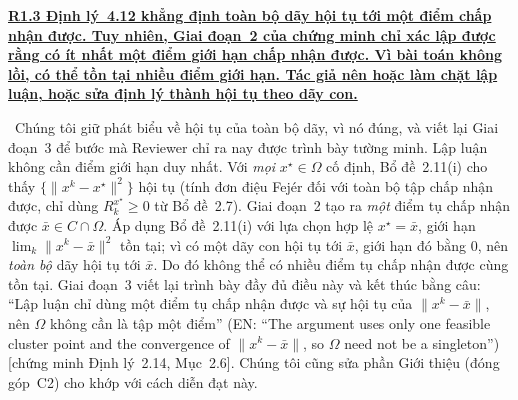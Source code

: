 \documentclass[11pt]{article}
\newcommand{\response}[1]{\smallskip\noindent{\color{blue!60!black}\textbf{Trả lời.}}\ #1\par\medskip}
\newcommand{\loc}[1]{\textcolor{blue!50!black}{[#1]}}
\newcommand{\en}[1]{{\color{gray}\small(EN: ``#1'')}}
\newenvironment{point}[1]{\medskip\noindent\textbf{\uline{#1}}\par}{\par}
\begin{document}
\begin{point}{R1.3 Định lý~4.12 khẳng định toàn bộ dãy hội tụ tới một điểm chấp nhận
được. Tuy nhiên, Giai đoạn~2 của chứng minh chỉ xác lập được rằng có ít nhất một điểm giới hạn
chấp nhận được. Vì bài toán không lồi, có thể tồn tại nhiều điểm giới hạn. Tác giả
nên hoặc làm chặt lập luận, hoặc sửa định lý thành hội tụ theo
dãy con.}
\response{Chúng tôi giữ phát biểu về hội tụ của toàn bộ dãy, vì nó đúng, và viết lại
Giai đoạn~3 để bước mà Reviewer chỉ ra nay được trình bày tường minh. Lập luận không
cần điểm giới hạn duy nhất. Với \emph{mọi} $x^\star\in\Omega$ cố định, Bổ đề~2.11(i)
cho thấy $\{\lVert x^k-x^\star\rVert^2\}$ hội tụ (tính đơn điệu Fej\'er đối với
toàn bộ tập chấp nhận được, chỉ dùng $R^{x^\star}_k\ge0$ từ Bổ đề~2.7). Giai đoạn~2
tạo ra \emph{một} điểm tụ chấp nhận được $\bar x\in C\cap\Omega$. Áp dụng Bổ đề~2.11(i)
với lựa chọn hợp lệ $x^\star=\bar x$, giới hạn $\lim_k\lVert x^k-\bar x\rVert^2$
tồn tại; vì có một dãy con hội tụ tới $\bar x$, giới hạn đó bằng $0$, nên \emph{toàn bộ}
dãy hội tụ tới $\bar x$. Do đó không thể có nhiều điểm tụ chấp nhận được cùng tồn tại.
Giai đoạn~3 viết lại trình bày đầy đủ điều này và kết thúc bằng câu: ``Lập luận chỉ dùng một
điểm tụ chấp nhận được và sự hội tụ của $\lVert x^k-\bar x\rVert$, nên $\Omega$ không cần là
tập một điểm'' \en{The argument uses only one feasible cluster point and the convergence of
$\lVert x^k-\bar x\rVert$, so $\Omega$ need not be a singleton} \loc{chứng minh Định lý~2.14,
Mục~2.6}. Chúng tôi cũng sửa phần Giới thiệu (đóng góp~C2) cho khớp với cách diễn đạt này.}
\end{point}
\end{document}
